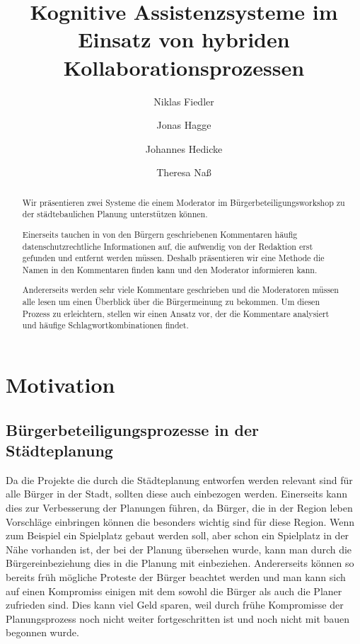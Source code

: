 \documentclass[runningheads]{llncs}
\begin{document}
%
\title{Kognitive Assistenzsysteme im Einsatz von hybriden Kollaborationsprozessen}
%
%
\author{Niklas Fiedler \and
Jonas Hagge \and
Johannes Hedicke \and
Theresa Naß }
%
%
%
\maketitle              %
%
\begin{abstract}
Wir präsentieren zwei Systeme die einem Moderator im Bürgerbeteiligungsworkshop zu der städtebaulichen Planung unterstützen können.

Einerseits tauchen in von den Bürgern geschriebenen Kommentaren häufig datenschutzrechtliche Informationen auf, die aufwendig von der Redaktion erst gefunden und entfernt werden müssen.
Deshalb präsentieren wir eine Methode die Namen in den Kommentaren finden kann und den Moderator informieren kann.

Andererseits werden sehr viele Kommentare geschrieben und die Moderatoren müssen alle lesen um einen Überblick über die Bürgermeinung zu bekommen. 
Um diesen Prozess zu erleichtern, stellen wir einen Ansatz vor, der die Kommentare analysiert und häufige Schlagwortkombinationen findet.

\end{abstract}
%
%
%
\section{Motivation}
	\subsection{Bürgerbeteiligungsprozesse in der Städteplanung}
		Da die Projekte die durch die Städteplanung entworfen werden relevant sind für alle Bürger in der Stadt, sollten diese auch einbezogen werden.
		Einerseits kann dies zur Verbesserung der Planungen führen, da Bürger, die in der Region leben Vorschläge einbringen können die besonders wichtig sind für diese Region.
		Wenn zum Beispiel ein Spielplatz gebaut werden soll, aber schon ein Spielplatz in der Nähe vorhanden ist, der bei der Planung übersehen wurde, kann man durch die Bürgereinbeziehung dies in die Planung mit einbeziehen.
		Andererseits können so bereits früh mögliche Proteste der Bürger beachtet werden und man kann sich auf einen Kompromiss einigen mit dem sowohl die Bürger als auch die Planer zufrieden sind.
		Dies kann viel Geld sparen, weil durch frühe Kompromisse der Planungsprozess noch nicht weiter fortgeschritten ist und noch nicht mit bauen begonnen wurde.
	
\end{document}
